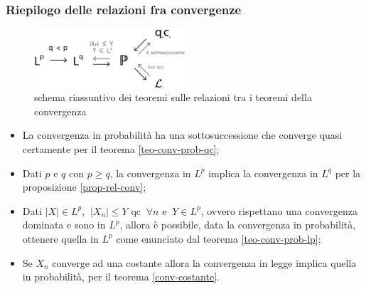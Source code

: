 \subsubsection{Riepilogo delle relazioni fra convergenze}
\begin{figure}[H]
  \centering
  \includegraphics[width=0.5\textwidth]{img/schema_convergenza.png}
  \caption{schema riassuntivo dei teoremi sulle relazioni tra i teoremi della convergenza}
\end{figure}
\begin{itemize}
  \item La convergenza in probabilità ha una sottosuccessione che converge quasi certamente per il teorema \ref{teo-conv-prob-qc};
  \item Dati $p$ e $q$ con $p \geq q$, la convergenza in $L^p$ implica la convergenza in $L^q$ per la proposizione \ref{prop-rel-conv};
  \item Dati $|X| \in L^p$, $\ |X_n| \le Y$ qc $\ \forall n$ e $\ Y \in L^p$, ovvero rispettano una convergenza dominata e sono in $L^p$, allora è possibile, data la convergenza in probabilità, ottenere quella in $L^p$ come enunciato dal teorema \ref{teo-conv-prob-lp};
  \item Se $X_n$ converge ad una costante allora la convergenza in legge implica quella in probabilità, per il teorema \ref{conv-costante}.
\end{itemize}

\cleardoublepage
